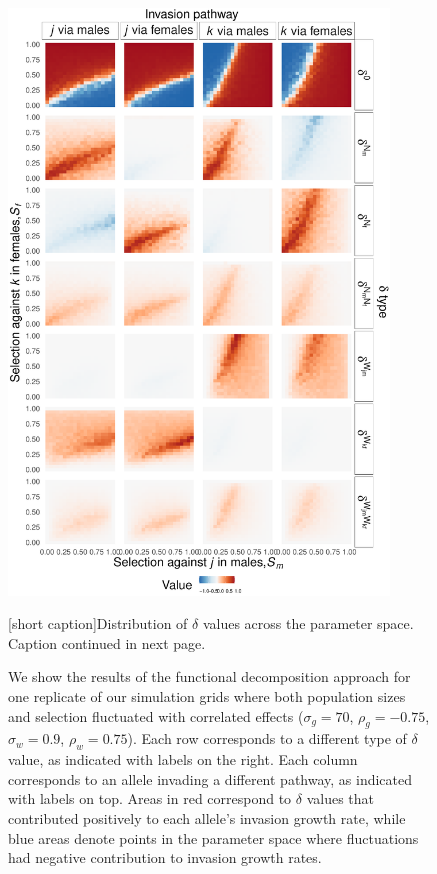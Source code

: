 \documentclass[12pt]{article}
\begin{document}

\begin{figure}[H]
  \centerline{\includegraphics[width=0.9\textwidth]{param_space.pdf}}
    \label{fig:space}
    [short caption]{Distribution of $\delta$ values across the parameter space. Caption continued in next page.}
\end{figure}

\addtocounter{figure}{-1}
\begin{figure} [H]
  \caption{ We show the results of the functional decomposition approach for one replicate of our simulation grids where  both population sizes and selection fluctuated with correlated effects  ($\sigma_{g}=70$, $\rho_{g}=-0.75$, $\sigma_{w}=0.9$, $\rho_{w}=0.75$). Each row corresponds to a different type of $\delta$ value, as indicated with labels on the right. Each column corresponds to an allele invading a different pathway, as indicated with labels on top. Areas in red correspond to $\delta$ values that contributed positively to each allele's invasion growth rate, while blue areas denote points in the parameter space where fluctuations had negative contribution to invasion growth rates.  }%
    \label{fig:space}
\end{figure}
\end{document}
